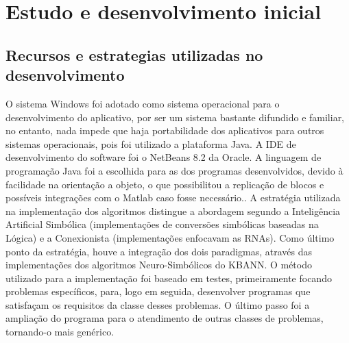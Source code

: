 \label{cap_3}

\section{Estudo e desenvolvimento inicial}


\subsection{Recursos e estrategias utilizadas no desenvolvimento}

	
O sistema  Windows foi adotado como sistema operacional para o desenvolvimento do aplicativo, por ser um sistema bastante difundido e familiar, no entanto, nada impede que haja portabilidade dos aplicativos para outros sistemas operacionais, pois foi utilizado a plataforma Java. A IDE de desenvolvimento do software foi o NetBeans 8.2 da  Oracle. A linguagem de programação Java foi a escolhida para as  dos programas desenvolvidos, devido à facilidade na orientação a objeto, o que possibilitou a replicação de blocos e possíveis integrações com o Matlab caso fosse necessário..
A estratégia utilizada na implementação dos algoritmos distingue a abordagem segundo a Inteligência Artificial Simbólica (implementações de conversões simbólicas baseadas na Lógica) e a Conexionista (implementações enfocavam as RNAs). Como último ponto da estratégia, houve a integração dos dois paradigmas, através das implementações dos algoritmos Neuro-Simbólicos do KBANN.
O método utilizado para a implementação foi baseado em testes, primeiramente focando problemas específicos, para, logo em seguida, desenvolver programas que satisfaçam os requisitos da classe desses problemas. O último passo foi a ampliação do programa para o atendimento de outras classes de problemas, tornando-o mais genérico.



